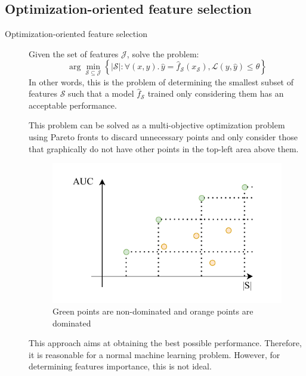 \subsection{Optimization-oriented feature selection}

\begin{description}
    \item[Optimization-oriented feature selection] 
        Given the set of features $\mathcal{J}$, solve the problem:
        \[ \arg\min_{\mathcal{S} \subseteq \mathcal{J}} \left\{ |\mathcal{S}|: \forall (x, y).\, \hat{y} = \hat{f}_\mathcal{S}(x_\mathcal{S}), \mathcal{L}(y, \hat{y}) \leq \theta \right\} \]
        In other words, this is the problem of determining the smallest subset of features $\mathcal{S}$ such that a model $\hat{f}_\mathcal{S}$ trained only considering them has an acceptable performance.

        \begin{remark}
            This problem can be solved as a multi-objective optimization problem using Pareto fronts to discard unnecessary points and only consider those that graphically do not have other points in the top-left area above them.

            \begin{figure}[H]
                \centering
                \includegraphics[width=0.5\linewidth]{./img/_pareto_front.pdf}
                \caption{Green points are non-dominated and orange points are dominated}
            \end{figure}
        \end{remark}

        \begin{remark}
            This approach aims at obtaining the best possible performance. Therefore, it is reasonable for a normal machine learning problem. However, for determining features importance, this is not ideal.
        \end{remark}
\end{description}


